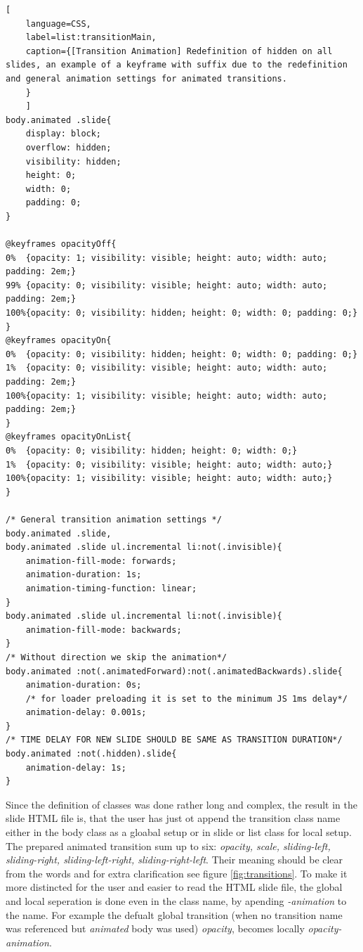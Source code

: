 \begin{minipage}{\linewidth}
	\begin{lstlisting}[
	language=CSS,
	label=list:transitionMain,
	caption={[Transition Animation] Redefinition of hidden on all slides, an example of a keyframe with suffix due to the redefinition and general animation settings for animated transitions.
	}
	]
body.animated .slide{
	display: block;
	overflow: hidden;
	visibility: hidden;
	height: 0;
	width: 0;
	padding: 0;
}

@keyframes opacityOff{
0%	{opacity: 1; visibility: visible; height: auto; width: auto; padding: 2em;}
99%	{opacity: 0; visibility: visible; height: auto; width: auto; padding: 2em;}
100%{opacity: 0; visibility: hidden; height: 0; width: 0; padding: 0;}
}
@keyframes opacityOn{
0%	{opacity: 0; visibility: hidden; height: 0; width: 0; padding: 0;}
1%	{opacity: 0; visibility: visible; height: auto; width: auto; padding: 2em;}
100%{opacity: 1; visibility: visible; height: auto; width: auto; padding: 2em;}
}
@keyframes opacityOnList{
0%	{opacity: 0; visibility: hidden; height: 0;	width: 0;}
1%	{opacity: 0; visibility: visible; height: auto; width: auto;}
100%{opacity: 1; visibility: visible; height: auto; width: auto;}
}

/* General transition animation settings */
body.animated .slide,
body.animated .slide ul.incremental li:not(.invisible){
	animation-fill-mode: forwards;
	animation-duration: 1s;
	animation-timing-function: linear;
}
body.animated .slide ul.incremental li:not(.invisible){
	animation-fill-mode: backwards;
}
/* Without direction we skip the animation*/
body.animated :not(.animatedForward):not(.animatedBackwards).slide{
	animation-duration: 0s;
	/* for loader preloading it is set to the minimum JS 1ms delay*/
	animation-delay: 0.001s;
}
/* TIME DELAY FOR NEW SLIDE SHOULD BE SAME AS TRANSITION DURATION*/
body.animated :not(.hidden).slide{
	animation-delay: 1s;		
}

	\end{lstlisting}
\end{minipage}

Since the definition of classes was done rather long and complex, the result in the slide HTML file is, that the user has just ot append the transition class name either in the body class as a gloabal setup or in slide or list class for local setup. The prepared 
animated transition sum up to six: \textit{opacity, scale, sliding-left, sliding-right, sliding-left-right, sliding-right-left}. Their meaning should be clear from the words and for extra clarification see figure \ref{fig:transitions}. To make it more distincted for the user and easier to read the HTML slide file, the global and local seperation is done even in the class name, by apending \textit{-animation} to the name. For example the defualt global transition (when no transition name was referenced but \textit{animated} body was used) \textit{opacity}, becomes locally \textit{opacity-animation}.

